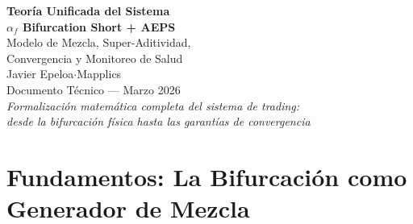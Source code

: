 \documentclass[11pt,a4paper]{article}
\newcommand{\af}{\alpha_f}
\begin{document}
\begin{center}
    {\LARGE\bfseries Teor\'ia Unificada del Sistema}\\[4pt]
    {\LARGE\bfseries $\af$ Bifurcation Short + AEPS}\\[6pt]
    {\large Modelo de Mezcla, Super-Aditividad,}\\[2pt]
    {\large Convergencia y Monitoreo de Salud}\\[16pt]
    {\large Javier Epeloa\quad$\cdot$\quad Mapplics}\\[8pt]
    {\normalsize Documento T\'ecnico --- Marzo 2026}\\[4pt]
    {\small\itshape Formalizaci\'on matem\'atica completa del sistema de trading:\\
    desde la bifurcaci\'on f\'isica hasta las garant\'ias de convergencia}
\end{center}

\vspace{8pt}

\begin{abstract}
Se presenta la formalizaci\'on matem\'atica completa del sistema
de trading $\af$ Bifurcation Short, integrando la se\~nal de entrada
con el sistema adaptativo de salida AEPS. Se demuestra que: (1) toda
se\~nal de entrada en mercados financieros genera inherentemente una
distribuci\'on bimodal de resultados, lo cual explica por qu\'e los
enfoques cl\'asicos de machine learning fracasan al intentar predecir
retornos; (2) el sistema AEPS explota esta bimodalidad mediante
clasificaci\'on secuencial post-entrada, reformulando el problema de
predicci\'on (irresoluble) como un problema de clasificaci\'on temporal
(resoluble); (3) la combinaci\'on se\~nal + AEPS es super-aditiva;
(4) se establecen formalmente las \textbf{tres condiciones} que
cualquier se\~nal de entrada debe cumplir para que AEPS genere edge;
(5) la convergencia del sistema se garantiza bajo condiciones
espec\'ificas y puede acelerarse mediante dry run pre-operativo;
y (6) un monitor de salud de tres alarmas detecta p\'erdida de
bimodalidad antes de da\~no significativo al capital. Se valida
emp\'iricamente sobre $N=46$ trades reales ($p = 0.000315$,
Mann-Whitney), demostrando profit factor 3.53 post-convergencia.
\end{abstract}

\tableofcontents
\newpage

\section{Fundamentos: La Bifurcaci\'on como Generador de Mezcla}
\label{sec:mixture}
\end{document}
